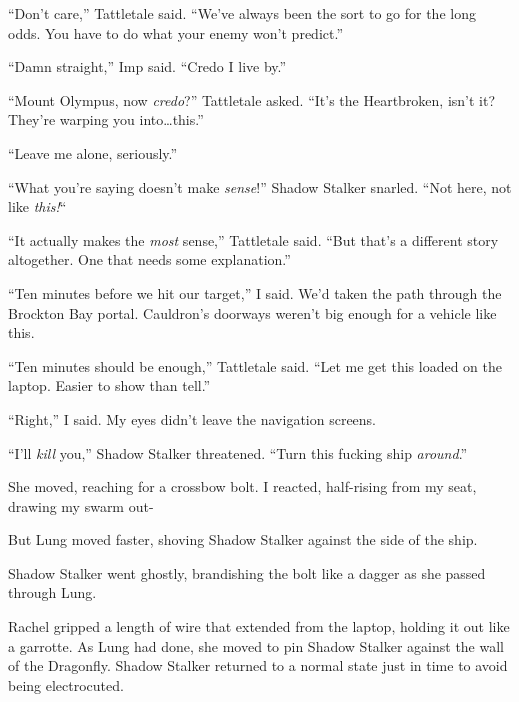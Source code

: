``Don't care,'' Tattletale said.  ``We've always been the sort to go for the long odds.  You have to do what your enemy won't predict.''



``Damn straight,'' Imp said.  ``Credo I live by.''



``Mount Olympus, now \emph{credo}?''  Tattletale asked.  ``It's the Heartbroken, isn't it?  They're warping you into\ldots this.''



``Leave me alone, seriously.''



``What you're saying doesn't make \emph{sense}!''  Shadow Stalker snarled.  ``Not here, not like \emph{this!}``



``It actually makes the \emph{most} sense,'' Tattletale said.  ``But that's a different story altogether.  One that needs some explanation.''



``Ten minutes before we hit our target,'' I said.  We'd taken the path through the Brockton Bay portal.  Cauldron's doorways weren't big enough for a vehicle like this.



``Ten minutes should be enough,'' Tattletale said.  ``Let me get this loaded on the laptop.  Easier to show than tell.''



``Right,'' I said.  My eyes didn't leave the navigation screens.



``I'll \emph{kill} you,'' Shadow Stalker threatened.  ``Turn this fucking ship \emph{around}.''



She moved, reaching for a crossbow bolt.  I reacted, half-rising from my seat, drawing my swarm out-



But Lung moved faster, shoving Shadow Stalker against the side of the ship.



Shadow Stalker went ghostly, brandishing the bolt like a dagger as she passed through Lung.



Rachel gripped a length of wire that extended from the laptop, holding it out like a garrotte.  As Lung had done, she moved to pin Shadow Stalker against the wall of the Dragonfly.  Shadow Stalker returned to a normal state just in time to avoid being electrocuted.




